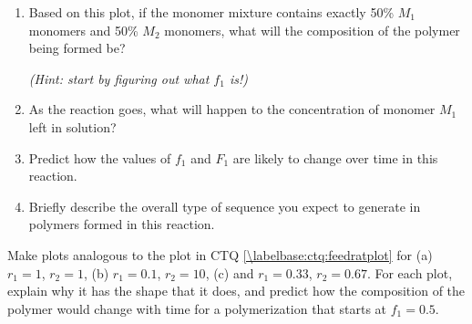 \begin{activity}[Copolymerization]
\begin{ctqs}
\begin{enumerate}
			
			\item Based on this plot, if the monomer mixture contains exactly 50\% $M_1$ monomers and 50\% $M_2$ monomers, what will the composition of the polymer being formed be? 
			
				\emph{(Hint: start by figuring out what $f_1$ is!)}
				
				\begin{solution}[0.5in]
				\end{solution}
			
			\item As the reaction goes, what will happen to the concentration of monomer $M_1$ left in solution?
				
				\begin{solution}[1in]
				\end{solution}
			
			\item Predict how the values of $f_1$ and $F_1$ are likely to change over time in this reaction.
				
				\begin{solution}[1in]
				\end{solution}
			
			\item Briefly describe the overall type of sequence you expect to generate in polymers formed in this reaction.
				
				\begin{solution}[1in]
				\end{solution}
		\end{enumerate}
\end{ctqs}


\begin{exercises}

	\exercise Make plots analogous to the plot in CTQ \ref{\labelbase:ctq:feedratplot} for (a) $r_1=1$, $r_2=1$, (b) $r_1=0.1$, $r_2=10$, (c) and $r_1=0.33$, $r_2 = 0.67$.  For each plot, explain why it has the shape that it does, and predict how the composition of the polymer would change with time for a polymerization that starts at $f_1=0.5$.
	
\end{exercises}


%
%	


	
\end{activity}